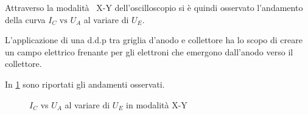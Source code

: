 	Attraverso la modalità  X-Y dell'oscilloscopio si è quindi
	osservato l'andamento della curva $I_C \text{ vs } U_A$ al
	variare di $U_E$.

	L'applicazione di una d.d.p tra griglia d'anodo e collettore ha lo scopo di creare un campo elettrico frenante per gli elettroni che emergono dall'anodo verso il collettore.

	In \figurename{ \ref{fig:ue}} sono riportati gli andamenti osservati.

\begin{figure}[h!]
		\centering
		\caption{$I_C$ vs $U_A$ al variare di $U_E$ in modalità X-Y}
	\label{fig:ue}
\end{figure}
